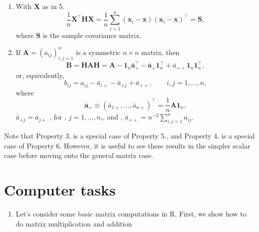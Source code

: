 \documentclass[]{book}
\providecommand{\tightlist}{%
  \setlength{\itemsep}{0pt}\setlength{\parskip}{0pt}}
\theoremstyle{definition}
\theoremstyle{definition}
\theoremstyle{definition}
\theoremstyle{remark}
\begin{document}
\begin{enumerate}
\[\begin{array}{ccc}
  -&(\boldsymbol x_1-\bar{\boldsymbol x})^\top&-\\
  -&(\boldsymbol x_2 -\bar{\boldsymbol x})^\top&-\\
  &\vdots&\\
  -&(\boldsymbol x_n - \bar{\boldsymbol x})^\top&-
  \end{array}\right ]= \left[ \boldsymbol x_1 -\bar{\boldsymbol x}, \ldots , \boldsymbol x_n-\bar{\boldsymbol x}\right]^\top
  \]
  where \[\bar{\boldsymbol x} = \frac{1}{n} \sum_{i=1}^n \boldsymbol x_i \in \mathbb{R}^p\]
  is the p-dimensional sample mean of \(\boldsymbol x_1, \ldots, \boldsymbol x_n\in \mathbb{R}^p\). In words, \(\boldsymbol H\) has subtracted the column mean from each column of \(\boldsymbol X\).
\item
  With \(\boldsymbol X\) as in 5.
  \[
  \frac{1}{n}\boldsymbol X^\top \boldsymbol H\boldsymbol X=\frac{1}{n} \sum_{i=1}^n (\boldsymbol x_i -\bar{\boldsymbol x})(\boldsymbol x_i -\bar{\boldsymbol x})^\top =\boldsymbol S,
  \]
  where \(\boldsymbol S\) is the sample covariance matrix.
\item
  If \(\boldsymbol A=(a_{ij})_{i,j=1}^n\) is a symmetric \(n \times n\) matrix, then
  \[
  \boldsymbol B=\boldsymbol H\boldsymbol A\boldsymbol H= \boldsymbol A- {\mathbf 1}_n \bar{\boldsymbol a}_+^\top -\bar{\boldsymbol a}_+{\mathbf 1}_n^\top +\bar{a}_{++}{\mathbf 1}_n {\mathbf 1}_n^\top,
  \]
  or, equivalently,
  \[
  b_{ij}=a_{ij}-\bar{a}_{i+}-\bar{a}_{+j}+\bar{a}_{++}, \qquad i,j=1, \ldots , n,
  \]
  where
  \[
  \bar{\boldsymbol a}_{+}\equiv (\bar{a}_{1+}, \ldots , \bar{a}_{n+})^\top=\frac{1}{n}\boldsymbol A{\mathbf 1}_n,
  \]
  \(\bar{a}_{+j}=\bar{a}_{j+}\) , for , \(j=1, \ldots , n\),, and , \(\bar{a}_{++}=n^{-2}\sum_{i,j=1}^n a_{ij}\).
\end{enumerate}

Note that Property 3. is a special case of Property 5., and Property 4. is a special case of Property 6.
However, it is useful to see these results in the simpler scalar case before moving onto the general matrix case.

\hypertarget{tasks-ch2}{%
\section{Computer tasks}\label{tasks-ch2}}

\begin{enumerate}
\def\labelenumi{\arabic{enumi}.}
\tightlist
\item
  Let's consider some basic matrix computations in R. First, we show how to do matrix multiplication and addition
\end{enumerate}
\end{document}
